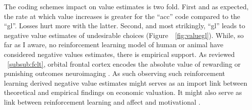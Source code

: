 \documentclass[doc,12pt]{apa}        %
\begin{document}
The coding schemes impact on value estimates is two fold.  First and as expected, the rate at which value increases is greater for the ``acc'' code compared to the ``gl''.  Losses hurt more with the latter.  Second, and most strikingly, ``gl'' leads to negative value estimates of undesirable choices (Figure~~\ref{fig:valuegl}).  While, so far as I aware, no reinforcement learning model of human or animal have considered negative values estimates, there is empirical support.  As reviewed ~\ref{subsub:fclt}, orbital frontal cortex encodes the absolute value of rewarding or punishing outcomes neuroimaging \cite{ODoherty:2001p2423,Hornak:2004p6234}.  As such observing such reinforcement learning derived negative value estimates might serves as an import link between theoretical and empirical findings on economic valuation.  It might also serve as link between reinforcement learning and affect and motivational \cite{Knutson:2005p1627,Delgado:2004p6665}.
\end{document}
